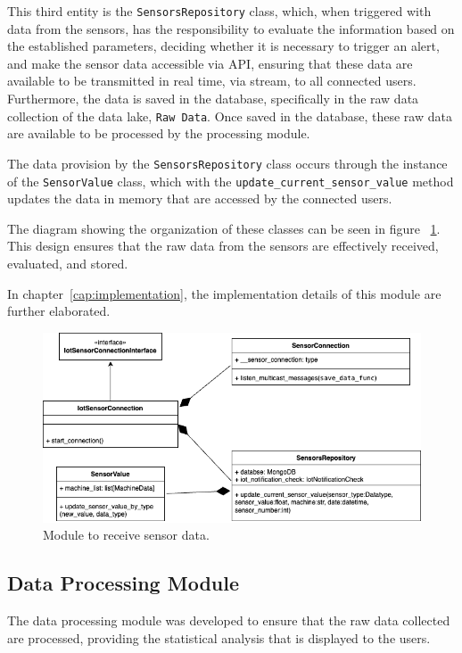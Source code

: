 This third entity is the \texttt{SensorsRepository} class, which, when triggered with data from the sensors, has the responsibility to evaluate the information based on the established parameters, deciding whether it is necessary to trigger an alert, and make the sensor data accessible via \gls{API}, ensuring that these data are available to be transmitted in real time, via stream, to all connected users. Furthermore, the data is saved in the database, specifically in the raw data collection of the data lake, \texttt{Raw Data}. Once saved in the database, these raw data are available to be processed by the processing module.

The data provision by the \texttt{SensorsRepository} class occurs through the instance of the \texttt{SensorValue} class, which with the \texttt{update\_current\_sensor\_value} method updates the data in memory that are accessed by the connected users.

The diagram showing the organization of these classes can be seen in figure ~\ref{fig:receiveData}. This design ensures that the raw data from the sensors are effectively received, evaluated, and stored.

In chapter~\ref{cap:implementation}, the implementation details of this module are further elaborated.


\begin{figure}[htbp]
	\centering
	\includegraphics[width=\textwidth]{images/recebimento_dados.png}
	\caption{Module to receive sensor data.}
	\label{fig:receiveData}
\end{figure}


\subsection{Data Processing Module}\label{subsec:moduloProcessamento}
The data processing module was developed to ensure that the raw data collected are processed, providing the statistical analysis that is displayed to the users.

